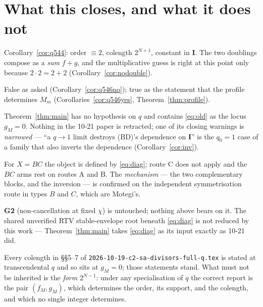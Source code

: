 \documentclass[11pt]{article}
\theoremstyle{definition}
\theoremstyle{remark}
\newcommand{\bI}{\mathbf{I}}
\begin{document}
\section{What this closes, and what it does not}

\begin{description}[leftmargin=1.4em]
\item[Q544 --- CLOSED.]  Corollary~\ref{cor:q544}: order $\equiv2$, colength $2^{N+1}$,
  constant in $\bI$.  The two doublings compose as a \emph{sum} $f+g$, and the
  multiplicative guess is right at this point only because $2\cdot2=2+2$
  (Corollary~\ref{cor:nodouble}).
\item[Q546 --- CLOSED, both halves.]  False as asked
  (Corollary~\ref{cor:q546no}); true as the statement that the profile determines $M_m$
  (Corollaries~\ref{cor:q546yes}, Theorem~\ref{thm:profile}).
\item[\texttt{thm:BD} --- strictly generalised, hypothesis removed.]
  Theorem~\ref{thm:main} has no hypothesis on $q$ and contains \eqref{eq:old} as the locus
  $g_M=0$.  Nothing in the 10-21 paper is retracted; one of its closing warnings is
  \emph{narrowed} --- ``a $q\to1$ limit destroys (BD)'s dependence on $\bI$'' is the
  $q_0=1$ case of a family that also inverts the dependence
  (Corollary~\ref{cor:inv}).
\item[A caveat on scope.]  For $X=BC$ the object is defined by \eqref{eq:diag}; route C
  does not apply and the $BC$ arms rest on routes A and B.  The \emph{mechanism} ---
  the two complementary blocks, and the inversion --- is confirmed on the independent
  symmetrisation route in types $B$ and $C$, which are Motegi's.
\item[Unchanged.]  \textbf{G2} (non-cancellation at fixed $\chi$) is untouched; nothing
  above bears on it.  The shared unverified RTV stable-envelope root beneath
  \eqref{eq:diag} is not reduced by this work --- Theorem~\ref{thm:main} takes
  \eqref{eq:diag} as its input exactly as 10-21 did.
\item[Downstream obligation.]  Every colength in \S\S5--7 of
  \texttt{2026-10-19-c2-sa-divisors-full-q.tex} is stated at transcendental $q$ and so sits
  at $g_M=0$; those statements stand.  What must not be inherited is the \emph{form}
  $2^{N-1}$: under any specialisation of $q$ the correct report is the pair
  $(f_M,g_M)$, which determines the order, its support, and the colength, and which no
  single integer determines.
\end{description}
\end{document}
